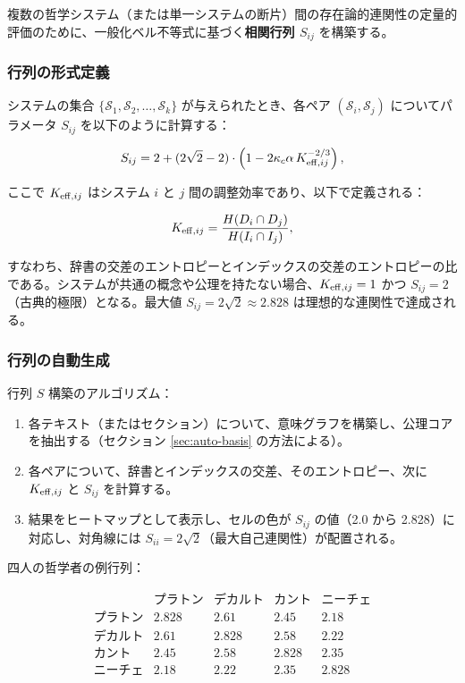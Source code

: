 \documentclass[11pt,a4paper]{article}
\newcommand{\kappac}{\kappa_c}
\begin{document}
	複数の哲学システム（または単一システムの断片）間の存在論的連関性の定量的評価のために、一般化ベル不等式に基づく\textbf{相関行列 \(S_{ij}\)} を構築する。
	
	\subsubsection{行列の形式定義}
	
	システムの集合 \(\{\mathcal{S}_1, \mathcal{S}_2, \dots, \mathcal{S}_k\}\) が与えられたとき、各ペア \((\mathcal{S}_i, \mathcal{S}_j)\) についてパラメータ \(S_{ij}\) を以下のように計算する：
	
	\[
	S_{ij} = 2 + (2\sqrt{2} - 2) \cdot \left(1 - 2\kappac \alpha \, \Keff[ij]^{-2/3}\right),
	\]
	
	ここで \(\Keff[ij]\) はシステム \(i\) と \(j\) 間の調整効率であり、以下で定義される：
	
	\[
	\Keff[ij] = \frac{H(D_i \cap D_j)}{H(I_i \cap I_j)},
	\]
	
	すなわち、辞書の交差のエントロピーとインデックスの交差のエントロピーの比である。システムが共通の概念や公理を持たない場合、\(\Keff[ij] = 1\) かつ \(S_{ij} = 2\)（古典的極限）となる。最大値 \(S_{ij} = 2\sqrt{2} \approx 2.828\) は理想的な連関性で達成される。
	
	\subsubsection{行列の自動生成}
	
	行列 \(S\) 構築のアルゴリズム：
	
	\begin{enumerate}
		\item 各テキスト（またはセクション）について、意味グラフを構築し、公理コアを抽出する（セクション \ref{sec:auto-basis} の方法による）。
		\item 各ペアについて、辞書とインデックスの交差、そのエントロピー、次に \(\Keff[ij]\) と \(S_{ij}\) を計算する。
		\item 結果をヒートマップとして表示し、セルの色が \(S_{ij}\) の値（2.0 から 2.828）に対応し、対角線には \(S_{ii} = 2\sqrt{2}\)（最大自己連関性）が配置される。
	\end{enumerate}
	
	四人の哲学者の例行列：
	
	\[
	\begin{array}{c|cccc}
		& \text{プラトン} & \text{デカルト} & \text{カント} & \text{ニーチェ} \\
		\hline
		\text{プラトン} & 2.828 & 2.61 & 2.45 & 2.18 \\
		\text{デカルト} & 2.61 & 2.828 & 2.58 & 2.22 \\
		\text{カント}   & 2.45 & 2.58 & 2.828 & 2.35 \\
		\text{ニーチェ}  & 2.18 & 2.22 & 2.35 & 2.828 \\
	\end{array}
	\]
	
\end{document}
